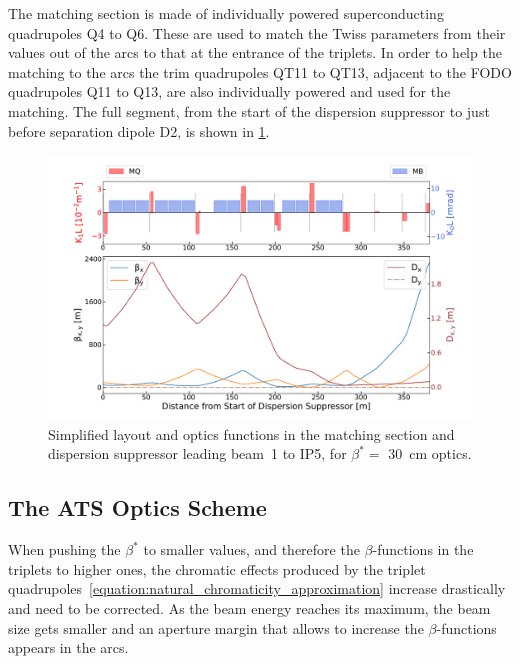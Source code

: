 The matching section is made of individually powered superconducting quadrupoles Q\num{4} to Q\num{6}.
These are used to match the Twiss parameters from their values out of the arcs to that at the entrance of the triplets.
In order to help the matching to the arcs the trim quadrupoles QT\num{11} to QT\num{13}, adjacent to the FODO quadrupoles Q\num{11} to Q\num{13}, are also individually powered and used for the matching.
The full segment, from the start of the dispersion suppressor to just before separation dipole D\num{2}, is shown in \cref{figure:lhc_matching_section}.

\begin{figure}[!hbt]
  \centering
  \includegraphics*[width=0.99\linewidth]{Figures/Optics_Measurements_Corrections_at_LHC/lhc_matching_section.pdf}
  \caption{Simplified layout and optics functions in the matching section and dispersion suppressor leading beam~\num{1} to IP\num{5}, for \(\beta^{\ast} =\) \qty{30}{\centi\meter} optics.}
  \label{figure:lhc_matching_section}
\end{figure}

\subsection{The ATS Optics Scheme}
\label{subsection:lhc_ats_optics_scheme}

When pushing the \(\beta^{\ast}\) to smaller values, and therefore the \(\beta\)-functions in the triplets to higher ones, the chromatic effects produced by the triplet quadrupoles~\cref{equation:natural_chromaticity_approximation} increase drastically and need to be corrected.
As the beam energy reaches its maximum, the beam size gets smaller and an aperture margin that allows to increase the \(\beta\)-functions appears in the arcs.

